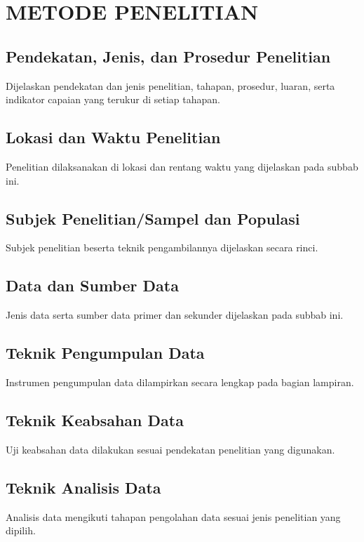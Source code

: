 \chapter{METODE PENELITIAN}
\section{Pendekatan, Jenis, dan Prosedur Penelitian}
Dijelaskan pendekatan dan jenis penelitian, tahapan, prosedur, luaran, serta indikator capaian
yang terukur di setiap tahapan.

\section{Lokasi dan Waktu Penelitian}
Penelitian dilaksanakan di lokasi dan rentang waktu yang dijelaskan pada subbab ini.

\section{Subjek Penelitian/Sampel dan Populasi}
Subjek penelitian beserta teknik pengambilannya dijelaskan secara rinci.

\section{Data dan Sumber Data}
Jenis data serta sumber data primer dan sekunder dijelaskan pada subbab ini.

\section{Teknik Pengumpulan Data}
Instrumen pengumpulan data dilampirkan secara lengkap pada bagian lampiran.

\section{Teknik Keabsahan Data}
Uji keabsahan data dilakukan sesuai pendekatan penelitian yang digunakan.

\section{Teknik Analisis Data}
Analisis data mengikuti tahapan pengolahan data sesuai jenis penelitian yang dipilih.
